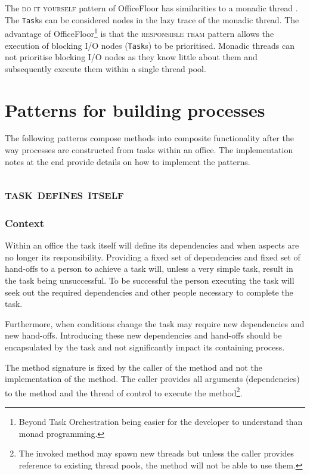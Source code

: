 \documentclass[prodmode]{style/acmlarge}
\begin{document}
The \textsc{do it yourself} pattern of OfficeFloor has similarities to a monadic
thread \cite{monadic-thread}.  The \texttt{Task}s can be considered nodes in the
lazy trace of the monadic thread.  The advantage of OfficeFloor\footnote{Beyond
Task Orchestration being easier for the developer to understand than monad
programming.} is that the \textsc{responsible team} pattern allows the execution
of blocking I/O nodes (\texttt{Task}s) to be prioritised.  Monadic threads can
not prioritise blocking I/O nodes as they know little about them and
subsequently execute them within a single thread pool.




\section{Patterns for building processes}

The following patterns compose methods into composite functionality after the
way processes are constructed from tasks within an office.  The implementation
notes at the end provide details on how to implement the patterns.


\subsection{\textsc{\textbf{task defines itself}}}

\subsubsection*{Context} Within an office the task itself will define its
dependencies and when aspects are no longer its responsibility.  Providing a
fixed set of dependencies and fixed set of hand-offs to a person to achieve a
task will, unless a very simple task, result in the task being unsuccessful.  To
be successful the person executing the task will seek out the required
dependencies and other people necessary to complete the task.

Furthermore, when conditions change the task may require new dependencies and
new hand-offs.  Introducing these new dependencies and hand-offs should be
encapsulated by the task and not significantly impact its containing process.

The method signature is fixed by the caller of the method and not the
implementation of the method.  The caller provides all arguments (dependencies)
to the method and the thread of control to execute the method\footnote{The
invoked method may spawn new threads but unless the caller provides reference to
existing thread pools, the method will not be able to use them.}.
\end{document}
